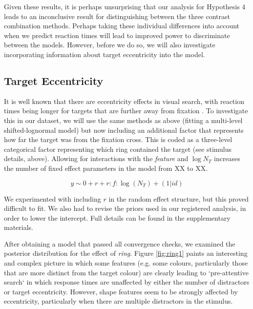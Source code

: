 \documentclass[preprint,12pt,authoryear]{elsarticle}
\begin{document}
Given these results, it is perhaps unsurprising that our analysis for Hypothesis 4 leads to an inconclusive result for distinguishing between the three contrast combination methods. Perhaps taking these individual differences into account when we predict reaction times will lead to improved power to discriminate between the models. However, before we do so, we will also investigate incorporating information about target eccentricity into the model.

\subsection{Target Eccentricity}

It is well known that there are eccentricity effects in visual search, with reaction times being longer for targets that are further away from fixation \citep{carrasco1995eccentricity}. To investigate this in our dataset, we will use the same methods as above (fitting a multi-level shifted-lognormal model) but now including an additional factor that represents how far the target was from the fixation cross. This is coded as a three-level categorical factor representing which ring contained the target (see stimulus details, above). Allowing for interactions with the \textit{feature} and $\log{N_T}$ increases the number of fixed effect parameters in the model from XX to XX. 

\begin{equation}
y \sim 0 + r + r:f:\log(N_T) + (1|id)
\end{equation}

We experimented with including $r$ in the random effect structure, but this proved difficult to fit. We also had to revise the priors used in our registered analysis, in order to lower the intercept. Full details can be found in the supplementary materials. 

After obtaining a model that passed all convergence checks, we examined the posterior distribution for the effect of \textit{ring}. Figure \ref{fig:ring1} paints an interesting and complex picture in which some features (e.g. some colours, particularly those that are more distinct from the target colour) are clearly leading to `pre-attentive search` in which response times are unaffected by either the number of distractors or target eccentricity. However, shape features seem to be strongly affected by eccentricity, particularly when there are multiple distractors in the stimulus.
\end{document}

